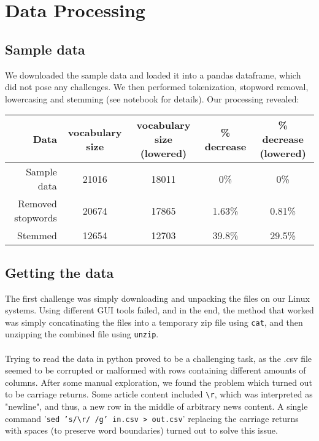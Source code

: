 \documentclass{article}
\begin{document}
\maketitle





\section{Data Processing}
\subsection{Sample data}
We downloaded the sample data and loaded it into a pandas dataframe, which did not pose any challenges. 
We then performed tokenization, stopword removal, lowercasing and stemming (see notebook for details). Our processing revealed:
\begin{table}[h]
    \centering
    \begin{tabular}{r| c | c | c| c}
      Data& vocabulary size & vocabulary size (lowered) & \% decrease & \% decrease (lowered)\\
        \hline
      Sample data& 21016 & 18011 & 0\% & 0\% \\
    \hline
      Removed stopwords & 20674 & 17865 & 1.63\% & 0.81\% \\
    \hline
      Stemmed & 12654 & 12703 & 39.8\% & 29.5\%
    \end{tabular}
\end{table}

\label{sec:headings}
\subsection{Getting the data}
The first challenge was simply downloading and unpacking the files on our Linux systems. Using different GUI tools failed, and in the end, the method that worked was simply concatinating the files into a temporary zip file using \texttt{cat}, and then unzipping the combined file using \texttt{unzip}.\\
\\
Trying to read the data in python proved to be a challenging task, as the .csv file seemed to be corrupted or malformed with rows containing different amounts of columns. After some manual exploration, we found the problem which turned out to be carriage returns. Some article content included \texttt{\textbackslash r}, which was interpreted as "newline", and thus, a new row in the middle of arbitrary news content. A single command '\texttt{sed 's/\textbackslash r/ /g' in.csv > out.csv}' replacing the carriage returns with spaces (to preserve word boundaries) turned out to solve this issue.\\
\end{document}

